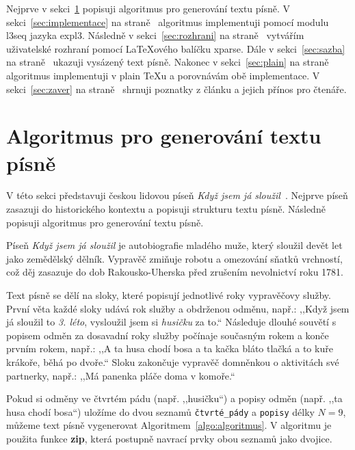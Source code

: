 \documentclass{csbulletin}
\newcommand\vref[1]{\ref{#1} na straně~\pageref{#1}}
\newcommand\pkg{\textsf}
\begin{document}
Nejprve v sekci~\ref{sec:algoritmus} popisuji algoritmus pro generování textu písně. V sekci~\vref{sec:implementace} algoritmus implementuji pomocí modulu \pkg{l3seq} jazyka expl3. Následně v sekci~\vref{sec:rozhrani} vytvářím uživatelské rozhraní pomocí \LaTeX ového balíčku \pkg{xparse}. Dále v sekci~\vref{sec:sazba} ukazuji vysázený text písně. Nakonec v sekci~\vref{sec:plain} algoritmus implementuji v plain \TeX u a porovnávám obě implementace. V sekci~\vref{sec:zaver} shrnuji poznatky z článku a jejich přínos pro čtenáře.

\section{Algoritmus pro generování textu písně}
\label{sec:algoritmus}

V této sekci představuji českou lidovou píseň \emph{Když jsem já sloužil}~\cite{hroudova2015kdyz}.
Nejprve píseň zasazuji do historického kontextu a popisuji strukturu textu písně.
Následně popisuji algoritmus pro generování textu písně.

Píseň \emph{Když jsem já sloužil} je autobiografie mladého muže, který sloužil devět let jako zemědělský dělník. Vypravěč zmiňuje robotu a omezování sňatků vrchností, což děj zasazuje do dob Rakousko-Uherska před zrušením nevolnictví roku 1781.

Text písně se dělí na sloky, které popisují jednotlivé roky vypravěčovy služby. První věta každé sloky udává rok služby a obdrženou odměnu, např.: ,,Když jsem já sloužil to \emph{3. léto}, vysloužil jsem si \emph{husičku} za to.`` Následuje dlouhé souvětí s popisem odměn za dosavadní roky služby počínaje současným rokem a konče prvním rokem, např.: ,,A ta husa chodí bosa a ta kačka bláto tlačká a to kuře krákoře, běhá po dvoře.`` Sloku zakončuje vypravěč domněnkou o aktivitách své partnerky, např.: ,,Má panenka pláče doma v komoře.``

Pokud si odměny ve čtvrtém pádu (např. ,,husičku``) a popisy odměn (např. ,,ta husa chodí bosa``) uložíme do dvou seznamů \texttt{čtvrté\_pády} a \texttt{popisy} délky $N=9$, můžeme text písně vygenerovat Algoritmem~\ref{algo:algoritmus}. V algoritmu je použita funkce \textbf{zip}, která postupně navrací prvky obou seznamů jako dvojice.
\end{document}
